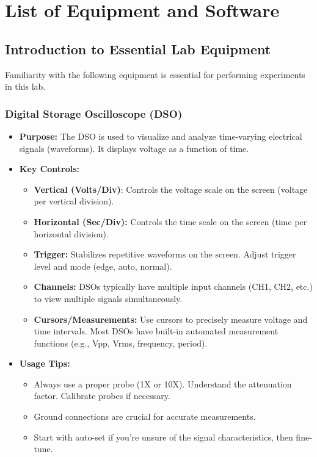 \chapter*{List of Equipment and Software}
\section*{Introduction to Essential Lab Equipment}
Familiarity with the following equipment is essential for performing experiments in this lab.
\subsection*{Digital Storage Oscilloscope (DSO)}

\begin{itemize}
	\item \textbf{Purpose:} The DSO is used to visualize and analyze time-varying electrical signals
(waveforms). It displays voltage as a function of time.
	\item \textbf{Key Controls:} 
	\begin{itemize}
		\item \textbf{Vertical (Volts/Div)}: Controls the voltage scale on the screen (voltage per
		vertical division).
		\item \textbf{Horizontal (Sec/Div):} Controls the time scale on the screen (time per horizontal
		division).
		\item \textbf{Trigger:} Stabilizes repetitive waveforms on the screen. Adjust trigger level and
		mode (edge, auto, normal).
		\item \textbf{Channels:} DSOs typically have multiple input channels (CH1, CH2, etc.) to view
		multiple signals simultaneously.
		\item \textbf{Cursors/Measurements:} Use cursors to precisely measure voltage and time
		intervals. Most DSOs have built-in automated measurement functions (e.g., Vpp,
		Vrms, frequency, period).
	\end{itemize}
	
	\item \textbf{Usage Tips:} 
	\begin{itemize}
		\item 	Always use a proper probe (1X or 10X). Understand the attenuation factor.
		Calibrate probes if necessary.
		\item Ground connections are crucial for accurate measurements.
		\item Start with auto-set if you're unsure of the signal characteristics, then fine-tune.
	\end{itemize}

\end{itemize}
